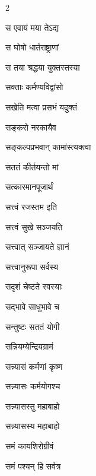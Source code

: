 \begin{multicols}{2}
\begin{indexlist}
\item स एवायं मया तेऽद्य \dotfill {}
\item स घोषो धार्तराष्ट्राणां \dotfill {}
\item स तया श्रद्धया युक्तस्तस्या \dotfill {}
\item सक्ताः कर्मण्यविद्वांसो \dotfill {}
\item सखेति मत्वा प्रसभं यदुक्तं \dotfill {}
\item सङ्करो नरकायैव \dotfill {}
\item सङ्कल्पप्रभवान् कामांस्त्यक्त्वा \dotfill {}
\item सततं कीर्तयन्तो मां \dotfill {}
\item सत्कारमानपूजार्थं \dotfill {}
\item सत्त्वं रजस्तम इति \dotfill {}
\item सत्त्वं सुखे सञ्जयति \dotfill {}
\item सत्त्वात् सञ्जायते ज्ञानं \dotfill {}
\item सत्त्वानुरूपा सर्वस्य \dotfill {}
\item सदृशं चेष्टते स्वस्याः \dotfill {}
\item सद्भावे साधुभावे च \dotfill {}
\item सन्तुष्टः सततं योगी \dotfill {}
\item सन्नियम्येन्द्रियग्रामं \dotfill {}
\item सन्न्यासं कर्मणां कृष्ण \dotfill {}
\item सन्न्यासः कर्मयोगश्च \dotfill {}
\item सन्न्यासस्तु महाबाहो \dotfill {}
\item सन्न्यासस्य महाबाहो \dotfill {}
\item समं कायशिरोग्रीवं \dotfill {}
\item समं पश्यन् हि सर्वत्र \dotfill {}

\end{indexlist}
\end{multicols}
